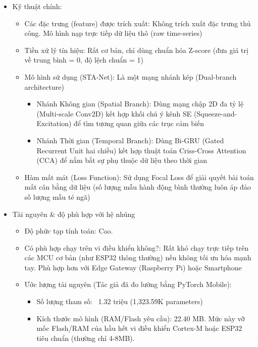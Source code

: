 \documentclass[../DoAn.tex]{subfiles}
\begin{document}
\begin{enumerate}[label=\arabic*)]
\begin{itemize}
\begin{itemize}
        \end{itemize}
        \item Kỹ thuật chính:
        \begin{itemize}
            \item Các đặc trưng (feature) được trích xuất: Không trích xuất đặc trưng thủ công. Mô hình nạp trực tiếp dữ liệu thô (raw time-series)
            \item Tiền xử lý tín hiệu: Rất cơ bản, chỉ dùng chuẩn hóa Z-score (đưa giá trị về trung bình = 0, độ lệch chuẩn = 1)
            \item Mô hình sử dụng (STA-Net): Là một mạng nhánh kép (Dual-branch architecture)
            \begin{itemize}
                \item Nhánh Không gian (Spatial Branch): Dùng mạng chập 2D đa tỷ lệ (Multi-scale Conv2D) kết hợp khối chú ý kênh SE (Squeeze-and-Excitation) để tìm tương quan giữa các trục cảm biến
                \item Nhánh Thời gian (Temporal Branch): Dùng Bi-GRU (Gated Recurrent Unit hai chiều) kết hợp thuật toán Criss-Cross Attention (CCA) để nắm bắt sự phụ thuộc dữ liệu theo thời gian
            \end{itemize}
            \item Hàm mất mát (Loss Function): Sử dụng Focal Loss để giải quyết bài toán mất cân bằng dữ liệu (số lượng mẫu hành động bình thường luôn áp đảo số lượng mẫu té ngã)
        \end{itemize}
        \item Tài nguyên & độ phù hợp với hệ nhúng
        \begin{itemize}
            \item Độ phức tạp tính toán: Cao.
            \item Có phù hợp chạy trên vi điều khiển không?: Rất khó chạy trực tiếp trên các MCU cơ bản (như ESP32 thông thường) nếu không tối ưu hóa mạnh tay. Phù hợp hơn với Edge Gateway (Raspberry Pi) hoặc Smartphone
            \item Ước lượng tài nguyên (Tác giả đã đo lường bằng PyTorch Mobile):
            \begin{itemize}
                \item Số lượng tham số: ~1.32 triệu (1,323.59K parameters)
                \item Kích thước mô hình (RAM/Flash yêu cầu): 22.40 MB. Mức này vỡ mốc Flash/RAM của hầu hết vi điều khiển Cortex-M hoặc ESP32 tiêu chuẩn (thường chỉ 4-8MB).
            \end{itemize}

\end{itemize}
\end{itemize}
\end{enumerate}
\end{document}
